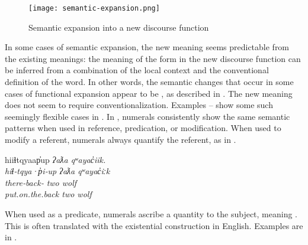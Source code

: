 \begin{figure}
  \centering
  \caption{Semantic expansion into a new discourse function}
  \label{fig:semantic-expansion}
  \texttt{[image: semantic-expansion.png]}
\end{figure}

In some cases of semantic expansion, the new meaning seems predictable from the existing meanings: the meaning of the form in the new discourse function can be inferred from a combination of the local context and the conventional definition of the word. In other words, the semantic changes that occur in some cases of functional expansion appear to be , as described in . The new meaning does not seem to require conventionalization. Examples – show some such seemingly flexible cases in . In , numerals consistently show the same semantic patterns when used in reference, predication, or modification. When used to modify a referent, numerals always quantify the referent, as in .

\begin{exe}
  \ex\label{ex:4.1}
  \vfix
  \gllll hiiɬtqyaap̓up            \em{ʔaƛa} qʷayac̓iik.\\
         hiɬ‑tqya·p̓i‑up          \em{ʔaƛa} qʷayac̓iːk\\
         there‑back‑ \em{two}  wolf\\
         put.on.the.back         \em{two}  wolf\\
         \vfix
\end{exe}

\noindent When used as a predicate, numerals ascribe a quantity to the subject, meaning . This is often translated with the existential construction  in English. Examples are in .

